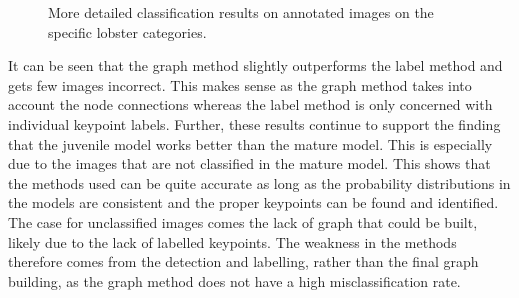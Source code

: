\begin{figure}[H]
\centering
\begin{minipage}{0.48\textwidth}
\end{minipage}
\hspace*{\fill}
\begin{minipage}{0.48\textwidth}
\end{minipage}
\caption{More detailed classification results on annotated images on the specific lobster categories.}
\end{figure}
\noindent
It can be seen that the graph method slightly outperforms the label method and gets few images incorrect. This makes sense as the graph method takes into account the node connections whereas the label method is only concerned with individual keypoint labels. Further, these results continue to support the finding that the juvenile model works better than the mature model. This is especially due to the images that are not classified in the mature model. This shows that the methods used can be quite accurate as long as the probability distributions in the models are consistent and the proper keypoints can be found and identified. The case for unclassified images comes the lack of graph that could be built, likely due to the lack of labelled keypoints. The weakness in the methods therefore comes from the detection and labelling, rather than the final graph building, as the graph method does not have a high misclassification rate. 

